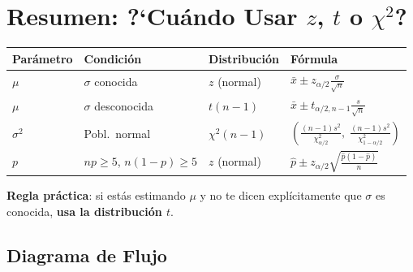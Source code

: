 \documentclass[11pt, a4paper]{article}
\begin{document}
\section{Resumen: ?`Cu\'ando Usar $z$, $t$ o $\chi^2$?}

\begin{center}
\begin{tabular}{p{2.5cm}p{3cm}p{3cm}p{4.5cm}}
\toprule
\textbf{Par\'ametro} & \textbf{Condici\'on} & \textbf{Distribuci\'on} & \textbf{F\'ormula} \\
\midrule
$\mu$ & $\sigma$ conocida & $z$ (normal) & $\bar{x} \pm z_{\alpha/2} \frac{\sigma}{\sqrt{n}}$ \\[6pt]
$\mu$ & $\sigma$ desconocida & $t(n-1)$ & $\bar{x} \pm t_{\alpha/2,n-1} \frac{s}{\sqrt{n}}$ \\[6pt]
$\sigma^2$ & Pobl.\ normal & $\chi^2(n-1)$ & $\left(\frac{(n-1)s^2}{\chi^2_{\alpha/2}},\; \frac{(n-1)s^2}{\chi^2_{1-\alpha/2}}\right)$ \\[6pt]
$p$ & $np \geq 5$, $n(1-p) \geq 5$ & $z$ (normal) & $\hat{p} \pm z_{\alpha/2}\sqrt{\frac{\hat{p}(1-\hat{p})}{n}}$ \\
\bottomrule
\end{tabular}
\end{center}

\textbf{Regla pr\'actica}: si est\'as estimando $\mu$ y no te dicen expl\'icitamente que $\sigma$ es conocida, \textbf{usa la distribuci\'on $t$}.

\subsection{Diagrama de Flujo}
\end{document}
